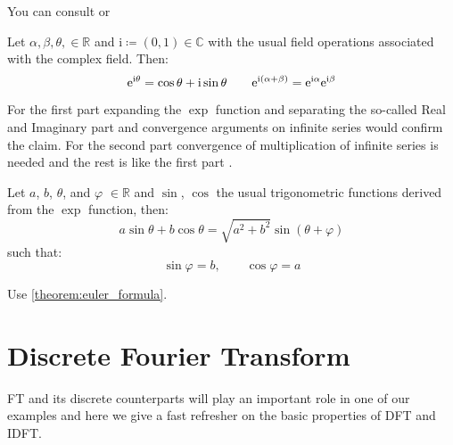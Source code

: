 \begin{Proof}
    You can consult \cite{Frazier1999} or \cite{Horn2012} \cite{Hackbusch2019}
\end{Proof}
\begin{Thm}\label{theorem:euler_formula}
    Let $\alpha,\beta,\theta, \in \mathbb{R}$ and $\mathrm{i} \coloneqq (0,1) \in \mathbb{C}$ with the usual field operations associated with the 
	complex field. Then:
	\begin{equation*}
		\mathrm{e}^{\mathrm{i}\theta} = \cos \theta +  \mathrm{i}\sin \theta \qquad  \mathrm{e}^{\mathrm{i}(\alpha+\beta)} = \mathrm{e}^{\mathrm{i}\alpha}\mathrm{e}^{\mathrm{i}\beta}\index{Euler formula}\index{Function!$\exp$}\index{Function!$\sin$}\index{Function!$\cos$}
	\end{equation*}
	\end{Thm}
	\begin{Proof}
		For the first part expanding the $\exp$ function and separating the so-called Real and Imaginary part and convergence arguments 
	on infinite series would confirm the claim\cite{Rudin1976}\cite{Rudin1987}\cite{Stein2005}\cite{Stein2003}. For the second part 
	convergence of multiplication of infinite series is needed and the rest is like the first part \cite{Rudin1976}\cite{Rudin1987}\cite{Stein2005}\cite{Stein2003}. 
	\end{Proof}
	\begin{Cor}
		Let $a$, $b$, $\theta$, and $\varphi$ $\in \mathbb{R}$ and $\sin$, $\cos$ the usual trigonometric functions derived from the $\exp$ function, then:
		\begin{equation*}
			a\sin \theta+b\cos \theta  = \sqrt{a^2+b^2}\sin(\theta + \varphi)
		\end{equation*}
		such that:
		\begin{equation*}
			\sin\varphi=b, \qquad \cos\varphi = a
		\end{equation*}
		\end{Cor}
	\begin{Proof}
		Use \cref{theorem:euler_formula}.
	\end{Proof}

\section{Discrete Fourier Transform}
\ac{FT} and its discrete counterparts will play an important role in one of our examples and here we give a fast refresher on the basic properties of \ac{DFT} and \ac{IDFT}.

